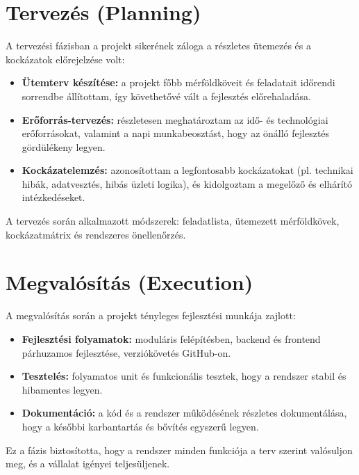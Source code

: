 \section{Tervezés (Planning)}

A tervezési fázisban a projekt sikerének záloga a részletes ütemezés és a kockázatok előrejelzése volt:
\begin{itemize}
    \item \textbf{Ütemterv készítése:} a projekt főbb mérföldköveit és feladatait időrendi sorrendbe állítottam, így követhetővé vált a fejlesztés előrehaladása.
    \item \textbf{Erőforrás-tervezés:} részletesen meghatároztam az idő- és technológiai erőforrásokat, valamint a napi munkabeosztást, hogy az önálló fejlesztés gördülékeny legyen.
    \item \textbf{Kockázatelemzés:} azonosítottam a legfontosabb kockázatokat (pl. technikai hibák, adatvesztés, hibás üzleti logika), és kidolgoztam a megelőző és elhárító intézkedéseket.
\end{itemize}

A tervezés során alkalmazott módszerek: feladatlista, ütemezett mérföldkövek, kockázatmátrix és rendszeres önellenőrzés.

\section{Megvalósítás (Execution)}

A megvalósítás során a projekt tényleges fejlesztési munkája zajlott:
\begin{itemize}
    \item \textbf{Fejlesztési folyamatok:} moduláris felépítésben, backend és frontend párhuzamos fejlesztése, verziókövetés GitHub-on.
    \item \textbf{Tesztelés:} folyamatos unit és funkcionális tesztek, hogy a rendszer stabil és hibamentes legyen.
    \item \textbf{Dokumentáció:} a kód és a rendszer működésének részletes dokumentálása, hogy a későbbi karbantartás és bővítés egyszerű legyen.
\end{itemize}

Ez a fázis biztosította, hogy a rendszer minden funkciója a terv szerint valósuljon meg, és a vállalat igényei teljesüljenek.

